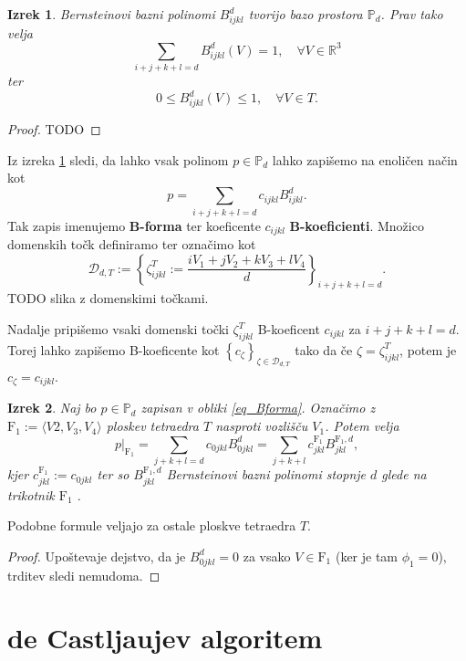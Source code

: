 \documentclass[11pt,a4paper]{article}
\newtheorem{theorem}{Izrek}
\begin{document}
\begin{theorem}\label{izrek_bernstein}
    Bernsteinovi bazni polinomi $B_{ijkl}^d$ tvorijo bazo prostora $\mathbb{P}_d$.
    Prav tako velja 
    \begin{equation}
        \sum_{i+j+k+l = d} B_{ijkl}^d(V) = 1, \quad \forall V \in \mathbb{R}^3     
    \end{equation}
    ter
    \begin{equation}
        0 \leq B_{ijkl}^d(V) \leq 1, \quad \forall V \in T.
    \end{equation}
\end{theorem}

\begin{proof}
    TODO
\end{proof}

Iz izreka \ref{izrek_bernstein} sledi, da lahko vsak polinom $p \in \mathbb{P}_d$
lahko zapišemo na enoličen način kot
\begin{equation}\label{eq_Bforma}
    p = \sum_{i+j+k+l = d} c_{ijkl} B_{ijkl}^d.
\end{equation}
Tak zapis imenujemo \textbf{B-forma} ter koeficente $c_{ijkl}$ \textbf{B-koeficienti}.
Množico domenskih točk definiramo ter označimo kot
\begin{equation}
    \mathcal{D}_{d,T} := 
    \left\{
        \zeta_{ijkl}^T:= \frac{i V_1 + j V_2 + k V_3 + l V_4}{d}
     \right\}_{i + j+ k+l = d}.
\end{equation}
TODO slika z domenskimi točkami.

Nadalje pripišemo vsaki domenski točki $\zeta_{ijkl}^T$ B-koeficent
$c_{ijkl}$ za $i +j+k+l = d$. Torej lahko zapišemo B-koeficente kot $\left\{
    c_{\zeta}
\right\}_{\zeta \in \mathcal{D}_{d,T}}$ tako da če $\zeta = \zeta_{ijkl}^T$,
potem je $c_{\zeta} = c_{ijkl}$.

\begin{theorem}
    Naj bo $p \in \mathbb{P}_d$ zapisan v obliki \eqref{eq_Bforma}. Označimo 
    z $\text{F}_1 := \langle V2,V_3,V_4 \rangle$ ploskev tetraedra $T$ nasproti vozlišču $V_1$.
    Potem velja 
    \begin{equation}
        p|_{\text{F}_1} = \sum_{j+k+l = d} c_{0jkl}B_{0jkl}^d = 
            \sum_{j+k+l}c_{jkl}^{\text{F}_1} B_{jkl}^{\text{F}_1,d},
    \end{equation}
    kjer $c_{jkl}^{\text{F}_1}:=c_{0jkl}$ ter so $B_{jkl}^{\text{F}_1,d}$
    Bernsteinovi bazni polinomi stopnje $d$ glede na trikotnik $\text{F}_1$ .
\end{theorem}

Podobne formule veljajo za ostale ploskve tetraedra $T$.

\begin{proof}
    Upoštevaje dejstvo, da je $B_{0jkl}^d = 0$ za vsako $V \in \text{F}_1$ (ker je 
    tam $\phi_1 = 0$), trditev sledi nemudoma.
\end{proof}

\section{de Castljaujev algoritem}
\end{document}
